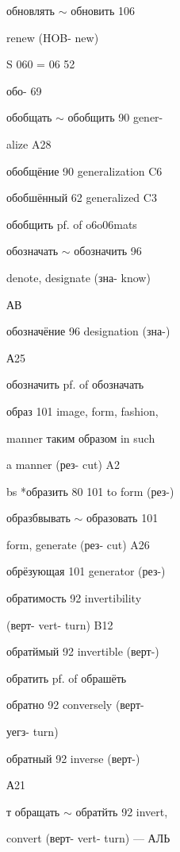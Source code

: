 \begin{minipage}[t]{0.475\textwidth}
\raggedright
\noindent обновлять $\sim$ обновить 106\par
\noindent renew (HOB- new)\par
\noindent S 060 = 06 52\par
\noindent обо- 69\par
\noindent обобщать $\sim$ обобщить 90 gener-\par
\noindent alize A28\par
\noindent обобщёние 90 generalization C6\par
\noindent обобшённый 62 generalized C3\par
\noindent обобщить pf. of o6o06mats\par
\noindent обозначать $\sim$ обозначить 96\par
\noindent denote, designate (зна- know)\par
\noindent АВ\par
\noindent обозначёние 96 designation (зна-)\par
\noindent А25\par
\noindent обозначить pf. of обозначать\par
\noindent образ 101 image, form, fashion,\par
\noindent manner таким образом in such\par
\noindent a manner (рез- cut) A2\par
\noindent bs *образить 80 101 to form (рез-)\par
\noindent образбвывать $\sim$ образовать 101\par
\noindent form, generate (рез- cut) A26\par
\noindent обрёзующая 101 generator (рез-)\par
\noindent обратимость 92 invertibility\par
\noindent (верт- vert- turn) B12\par
\noindent обратймый 92 invertible (верт-)\par
\noindent обратить pf. of обрашёть\par
\noindent обратно 92 conversely (верт-\par
\noindent уегз- turn)\par
\noindent обратный 92 inverse (верт-)\par
\noindent А21\par
\noindent т обращать $\sim$ обратйть 92 invert,\par
\noindent convert (верт- vert- turn) — АЛЬ\par

\end{minipage}
